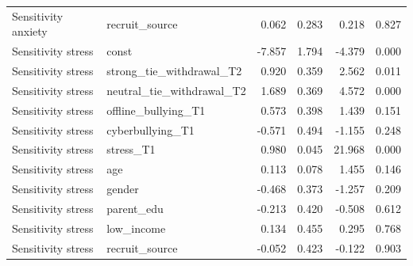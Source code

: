 \begin{table}
\begin{tabular}{llrrrr}
Sensitivity anxiety & recruit_source & 0.062 & 0.283 & 0.218 & 0.827 \\
Sensitivity stress & const & -7.857 & 1.794 & -4.379 & 0.000 \\
Sensitivity stress & strong_tie_withdrawal_T2 & 0.920 & 0.359 & 2.562 & 0.011 \\
Sensitivity stress & neutral_tie_withdrawal_T2 & 1.689 & 0.369 & 4.572 & 0.000 \\
Sensitivity stress & offline_bullying_T1 & 0.573 & 0.398 & 1.439 & 0.151 \\
Sensitivity stress & cyberbullying_T1 & -0.571 & 0.494 & -1.155 & 0.248 \\
Sensitivity stress & stress_T1 & 0.980 & 0.045 & 21.968 & 0.000 \\
Sensitivity stress & age & 0.113 & 0.078 & 1.455 & 0.146 \\
Sensitivity stress & gender & -0.468 & 0.373 & -1.257 & 0.209 \\
Sensitivity stress & parent_edu & -0.213 & 0.420 & -0.508 & 0.612 \\
Sensitivity stress & low_income & 0.134 & 0.455 & 0.295 & 0.768 \\
Sensitivity stress & recruit_source & -0.052 & 0.423 & -0.122 & 0.903 \\
\bottomrule
\end{tabular}
\end{table}
